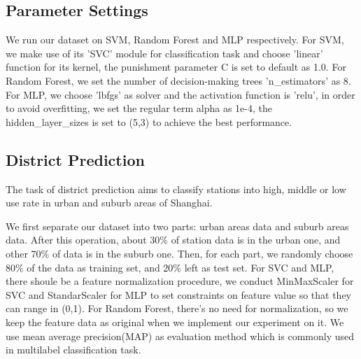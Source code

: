 \subsection{Parameter Settings}
We run our dataset on SVM, Random Forest and MLP respectively. For SVM, we make use of its 'SVC' module for classification task and choose 'linear' function for its kernel, the punishment parameter C is set to default as 1.0. For Random Forest, we set the number of decision-making trees 'n\_estimators' as 8. For MLP, we choose 'lbfgs' as solver and the activation function is 'relu', in order to avoid overfitting, we set the regular term alpha as 1e-4, the hidden\_layer\_sizes is set to (5,3) to achieve the best performance.

\subsection{District Prediction}
The task of district prediction aims to classify stations into high, middle or low use rate in urban and suburb areas of Shanghai.

We first separate our dataset into two parts: urban areas data and suburb areas data. After this operation, about 30\% of station data is in the urban one, and other 70\% of data is in the suburb one. Then, for each part, we randomly choose 80\% of the data as training set, and 20\% left as test set. For SVC and MLP, there shoule be a feature normalization procedure, we conduct MinMaxScaler for SVC and StandarScaler for MLP to set constraints on feature value so that they can range in (0,1). For Random Forest, there's no need for normalization, so we keep the feature data as original when we implement our experiment on it. We use mean average precision(MAP) as evaluation method which is commonly used in multilabel classification task.

